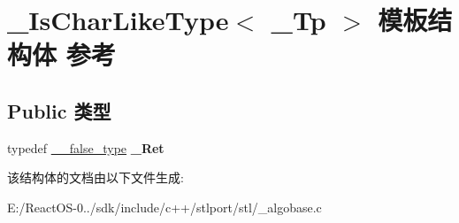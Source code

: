 \hypertarget{struct___is_char_like_type}{}\section{\+\_\+\+Is\+Char\+Like\+Type$<$ \+\_\+\+Tp $>$ 模板结构体 参考}
\label{struct___is_char_like_type}
\subsection*{Public 类型}
\begin{DoxyCompactItemize}
\item 
\mbox{\label{struct___is_char_like_type_ad400d868f9c647dcaf297748527acdd6}} 
typedef \hyperlink{struct____false__type}{\+\_\+\+\_\+false\+\_\+type} {\bfseries \+\_\+\+Ret}
\end{DoxyCompactItemize}


该结构体的文档由以下文件生成\+:\begin{DoxyCompactItemize}
\item 
E\+:/\+React\+O\+S-\/0../sdk/include/c++/stlport/stl/\+\_\+algobase.\+c\end{DoxyCompactItemize}
